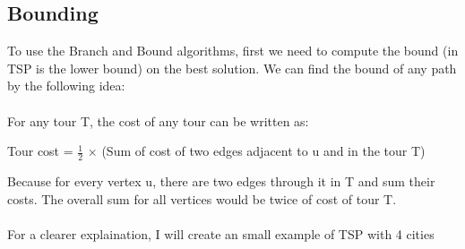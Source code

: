 \documentclass[a4paper]{article}
\begin{document}
\subsection{Bounding}
To use the Branch and Bound algorithms, first we need to compute the bound (in TSP is the lower bound) on the best solution. We can find the bound of any path by the following idea:\\ \\
For any tour T, the cost of any tour can be written as:
\begin{center}
    Tour cost = $\frac{1}{2}$ $\times$ (Sum of cost of two edges adjacent to u and in the tour T) 
\end{center}
Because for every vertex u, there are two edges through it in T
and sum their costs. The overall sum for all vertices would
be twice of cost of tour T.\\ \\
For a clearer explaination, I will create an small example of TSP with 4 cities
\end{document}
